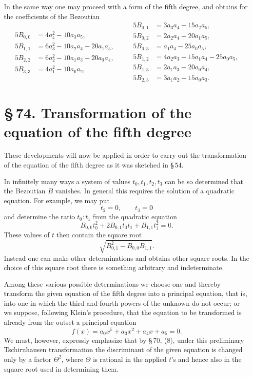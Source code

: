 \documentclass[11pt]{article}
\newcommand{\sect}[2]{\section*{\S\,#1. #2}}
\begin{document}
In the same way one may proceed with a form of the fifth degree, and obtains for the coefficients of the Bezoutian
\[
\begin{aligned}
5B_{0,0}&=4a_4^2-10a_3a_5,\\
5B_{1,1}&=6a_3^2-10a_2a_4-20a_1a_5,\\
5B_{2,2}&=6a_2^2-10a_1a_3-20a_0a_4,\\
5B_{3,3}&=4a_1^2-10a_0a_2,
\end{aligned}\qquad
\begin{aligned}
5B_{0,1}&=3a_3a_4-15a_2a_5,\\
5B_{0,2}&=2a_2a_4-20a_1a_5,\\
5B_{0,3}&=a_1a_4-25a_0a_5,\\
5B_{1,2}&=4a_2a_3-15a_1a_4-25a_0a_5,\\
5B_{1,3}&=2a_1a_3-20a_0a_4,\\
5B_{2,3}&=3a_1a_2-15a_0a_3.
\end{aligned}
\]

\sect{74}{Transformation of the equation of the fifth degree}

These developments will now be applied in order to carry out the transformation of the equation of the fifth degree as it was sketched in \S\,54.

In infinitely many ways a system of values $t_0,t_1,t_2,t_3$ can be so determined that the Bezoutian $B$ vanishes. In general this requires the solution of a quadratic equation. For example, we may put
\[
 t_2=0,
 \qquad t_3=0
\]
and determine the ratio $t_0:t_1$ from the quadratic equation
\[
 B_{0,0}t_0^2+2B_{0,1}t_0t_1+B_{1,1}t_1^2=0.
\]
These values of $t$ then contain the square root
\[
 \sqrt{B_{0,1}^2-B_{0,0}B_{1,1}}.
\]
Instead one can make other determinations and obtains other square roots. In the choice of this square root there is something arbitrary and indeterminate.

Among these various possible determinations we choose one and thereby transform the given equation of the fifth degree into a principal equation, that is, into one in which the third and fourth powers of the unknown do not occur; or we suppose, following Klein's procedure, that the equation to be transformed is already from the outset a principal equation
\begin{equation}
 f(x)=a_0x^5+a_3x^2+a_4x+a_5=0.
\tag{1}
\end{equation}
We must, however, expressly emphasize that by \S\,70, (8), under this preliminary Tschirnhausen transformation the discriminant of the given equation is changed only by a factor $\Theta^2$, where $\Theta$ is rational in the applied $t$'s and hence also in the square root used in determining them.
\end{document}
